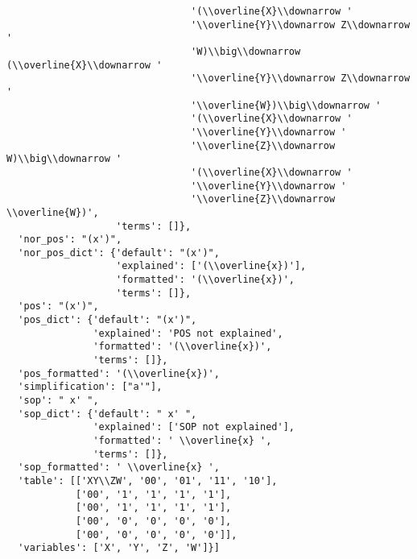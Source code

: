\begin{verbatim}
                                '(\\overline{X}\\downarrow '
                                '\\overline{Y}\\downarrow Z\\downarrow '
                                'W)\\big\\downarrow (\\overline{X}\\downarrow '
                                '\\overline{Y}\\downarrow Z\\downarrow '
                                '\\overline{W})\\big\\downarrow '
                                '(\\overline{X}\\downarrow '
                                '\\overline{Y}\\downarrow '
                                '\\overline{Z}\\downarrow W)\\big\\downarrow '
                                '(\\overline{X}\\downarrow '
                                '\\overline{Y}\\downarrow '
                                '\\overline{Z}\\downarrow \\overline{W})',
                   'terms': []},
  'nor_pos': "(x')",
  'nor_pos_dict': {'default': "(x')",
                   'explained': ['(\\overline{x})'],
                   'formatted': '(\\overline{x})',
                   'terms': []},
  'pos': "(x')",
  'pos_dict': {'default': "(x')",
               'explained': 'POS not explained',
               'formatted': '(\\overline{x})',
               'terms': []},
  'pos_formatted': '(\\overline{x})',
  'simplification': ["a'"],
  'sop': " x' ",
  'sop_dict': {'default': " x' ",
               'explained': ['SOP not explained'],
               'formatted': ' \\overline{x} ',
               'terms': []},
  'sop_formatted': ' \\overline{x} ',
  'table': [['XY\\ZW', '00', '01', '11', '10'],
            ['00', '1', '1', '1', '1'],
            ['00', '1', '1', '1', '1'],
            ['00', '0', '0', '0', '0'],
            ['00', '0', '0', '0', '0']],
  'variables': ['X', 'Y', 'Z', 'W']}]
        \end{verbatim}
    

\pagebreak
